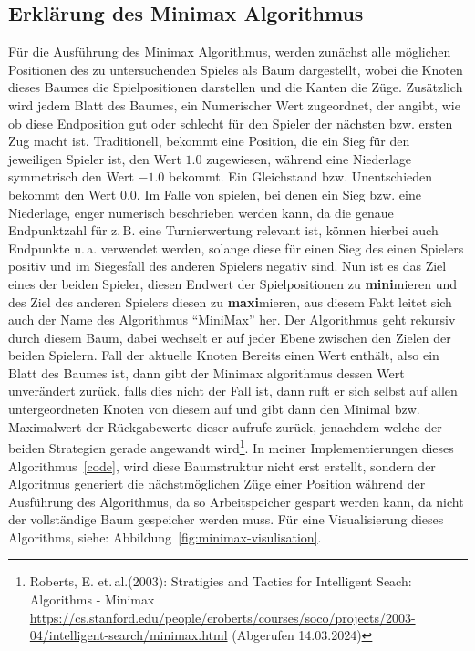 \documentclass[12pt, a4paper, oneside, openright]{article}
\newcommand \zB{z.\,B.\xspace }
\newcommand \ua{u.\,a.\xspace }
\newcommand \bzw{bzw.\xspace }
\newcommand \etal{et.\,al.\xspace }
\begin{document}
\subsection{Erklärung des Minimax Algorithmus}\label{subsec:erklarung-des-minimax-algorithmus}
Für die Ausführung des Minimax Algorithmus, werden zunächst alle möglichen Positionen des zu untersuchenden Spieles als Baum dargestellt, wobei die Knoten dieses Baumes die Spielpositionen darstellen und die Kanten die Züge.
Zusätzlich wird jedem Blatt des Baumes, ein Numerischer Wert zugeordnet, der angibt, wie ob diese Endposition gut oder schlecht für den Spieler der nächsten \bzw ersten Zug macht ist.
Traditionell, bekommt eine Position, die ein Sieg für den jeweiligen Spieler ist, den Wert $ 1.0 $ zugewiesen, während eine Niederlage symmetrisch den Wert $ -1.0 $ bekommt.
Ein Gleichstand \bzw Unentschieden bekommt den Wert $ 0.0 $.
Im Falle von spielen, bei denen ein Sieg \bzw eine Niederlage, enger numerisch beschrieben werden kann, da die genaue Endpunktzahl für \zB eine Turnierwertung relevant ist, können hierbei auch Endpunkte \ua verwendet werden, solange diese für einen Sieg des einen Spielers positiv und im Siegesfall des anderen Spielers negativ sind.
Nun ist es das Ziel eines der beiden Spieler, diesen Endwert der Spielpositionen zu \textbf{mini}mieren und des Ziel des anderen Spielers diesen zu \textbf{maxi}mieren, aus diesem Fakt leitet sich auch der Name des Algorithmus \enquote{MiniMax} her.
Der Algorithmus geht rekursiv durch diesem Baum, dabei wechselt er auf jeder Ebene zwischen den Zielen der beiden Spielern.
Fall der aktuelle Knoten Bereits einen Wert enthält, also ein Blatt des Baumes ist, dann gibt der Minimax algorithmus dessen Wert unverändert zurück, falls dies nicht der Fall ist, dann ruft er sich selbst auf allen untergeordneten Knoten von diesem auf und gibt dann den Minimal \bzw Maximalwert der Rückgabewerte dieser aufrufe zurück, jenachdem welche der beiden Strategien gerade angewandt wird\footnote{Roberts, E. \etal (2003): Stratigies and Tactics for Intelligent Seach: Algorithms - Minimax \url{https://cs.stanford.edu/people/eroberts/courses/soco/projects/2003-04/intelligent-search/minimax.html} (Abgerufen 14.03.2024)}.
In meiner Implementierungen dieses Algorithmus~\ref{code}, wird diese Baumstruktur nicht erst erstellt, sondern der Algoritmus generiert die nächstmöglichen Züge einer Position während der Ausführung des Algorithmus, da so Arbeitspeicher gespart werden kann, da nicht der vollständige Baum gespeicher werden muss.
Für eine Visualisierung dieses Algorithms, siehe: Abbildung~\ref{fig:minimax-visulisation}.
\end{document}
